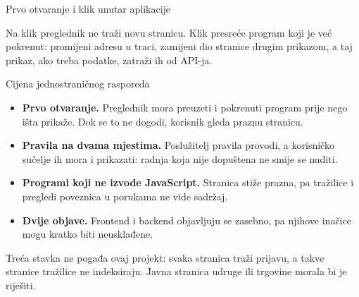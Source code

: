 \begin{frame}{Prvo otvaranje i klik unutar aplikacije}
\begin{center}
\end{center}

\vspace{0.4em}
Na klik preglednik ne traži novu stranicu. Klik presreće program koji je već pokrenut: promijeni adresu u traci, zamijeni dio stranice drugim prikazom, a taj prikaz, ako treba podatke, zatraži ih od API-ja.
\end{frame}

\begin{frame}{Cijena jednostraničnog rasporeda}
\begin{itemize}
  \itemsep0.5em
  \item \textbf{Prvo otvaranje.} Preglednik mora preuzeti i pokrenuti program prije nego išta prikaže. Dok se to ne dogodi, korisnik gleda praznu stranicu.
  \item \textbf{Pravila na dvama mjestima.} Poslužitelj pravila provodi, a korisničko sučelje ih mora i prikazati: radnja koja nije dopuštena ne smije se nuditi.
  \item \textbf{Programi koji ne izvode JavaScript.} Stranica stiže prazna, pa tražilice i pregledi poveznica u porukama ne vide sadržaj.
  \item \textbf{Dvije objave.} Frontend i backend objavljuju se zasebno, pa njihove inačice mogu kratko biti neusklađene.
\end{itemize}

\vspace{0.5em}
Treća stavka ne pogađa ovaj projekt: svaka stranica traži prijavu, a takve stranice tražilice ne indeksiraju. Javna stranica udruge ili trgovine morala bi je riješiti.
\end{frame}

